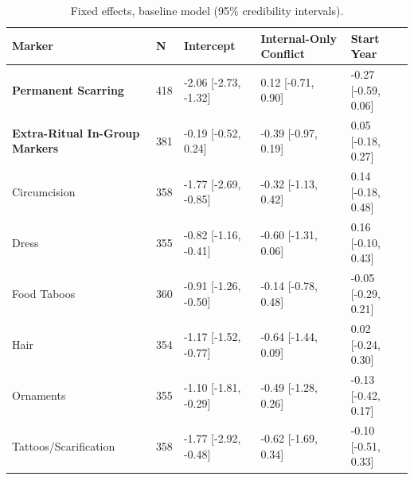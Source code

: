 \begin{table}[!ht]
\centering
\small
\caption{Fixed effects, baseline model (95\% credibility intervals).}
\label{tab:intonly_fixed_effects_baseline}
\begin{tabular}{p{4cm}llll}
\toprule
Marker & N & Intercept & Internal-Only Conflict & Start Year \\
\midrule
\textbf{Permanent Scarring} & 418 & -2.06 [-2.73, -1.32] & 0.12 [-0.71, 0.90] & -0.27 [-0.59, 0.06] \\
\textbf{Extra-Ritual In-Group Markers} & 381 & -0.19 [-0.52, 0.24] & -0.39 [-0.97, 0.19] & 0.05 [-0.18, 0.27] \\
\midrule
Circumcision & 358 & -1.77 [-2.69, -0.85] & -0.32 [-1.13, 0.42] & 0.14 [-0.18, 0.48] \\
Dress & 355 & -0.82 [-1.16, -0.41] & -0.60 [-1.31, 0.06] & 0.16 [-0.10, 0.43] \\
Food Taboos & 360 & -0.91 [-1.26, -0.50] & -0.14 [-0.78, 0.48] & -0.05 [-0.29, 0.21] \\
Hair & 354 & -1.17 [-1.52, -0.77] & -0.64 [-1.44, 0.09] & 0.02 [-0.24, 0.30] \\
Ornaments & 355 & -1.10 [-1.81, -0.29] & -0.49 [-1.28, 0.26] & -0.13 [-0.42, 0.17] \\
Tattoos/Scarification & 358 & -1.77 [-2.92, -0.48] & -0.62 [-1.69, 0.34] & -0.10 [-0.51, 0.33] \\
\bottomrule
\end{tabular}
\end{table}